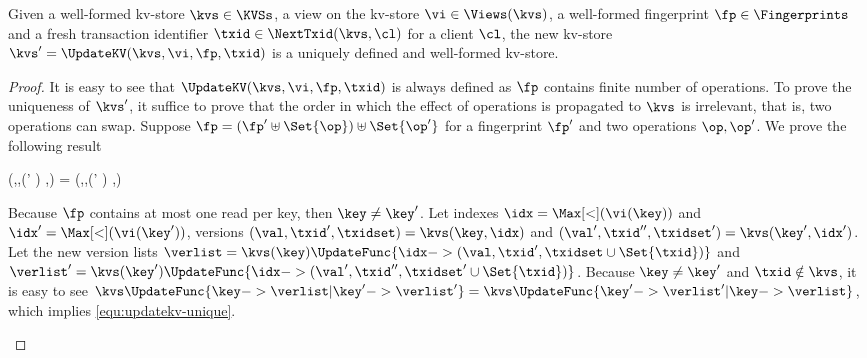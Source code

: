 \begin{toappendix} 
\label{sec:proof-well-formed-updatekv}
\end{toappendix} 
\begin{theoremrep}
\label{thm:well-deifned-updatekv}
Given a well-formed kv-store \( \kvs \in \KVSs \), a view on the kv-store \( \vi \in \Views(\kvs) \),
a well-formed fingerprint \( \fp \in \Fingerprints \) and 
a fresh transaction identifier \( \txid \in \NextTxid(\kvs,\cl) \) for a client \( \cl \),
the new kv-store \( \kvs' = \UpdateKV(\kvs,\vi,\fp,\txid)\) 
is a uniquely defined and well-formed kv-store.
\end{theoremrep}
\begin{proof}
It is easy to see that  \(\UpdateKV(\kvs,\vi,\fp,\txid) \) is always defined 
as \( \fp \) contains finite number of operations.
To prove the uniqueness of \( \kvs' \), it suffice to prove that the order 
in which the effect of operations is propagated to \( \kvs \) is irrelevant,
that is, two operations can swap.
Suppose \( \fp = (\fp' \uplus \Set{\op}) \uplus \Set{\op'} \) 
for a fingerprint \( \fp' \) and two operations \( \op, \op' \).
We prove  the following result
\begin{Formulae}
\begin{Formula}
    \UpdateKV(\kvs,\vi,(\fp' \uplus \Set{\op}) \uplus {},\txid) 
    = \UpdateKV(\kvs,\vi,(\fp' \uplus {}) \uplus \Set{\op},\txid)   
\end{Formula}
\label{equ:updatekv-unique}
\end{Formulae}
\begin{enumerate}
    \label{item:updatekv-unique-opr-opr}
    Because \( \fp \) contains at most one read per key, then \( \key \neq \key' \).
    Let indexes \( \idx = \Max[<](\vi(\key)) \) and 
    \(\idx' = \Max[<](\vi(\key')) \), 
    versions \( (\val,\txid',\txidset) = \kvs(\key,\idx) \) and
    \( (\val',\txid'',\txidset') = \kvs(\key',\idx') \).
    Let the new version lists 
    \( \verlist = \kvs(\key)\UpdateFunc{\idx -> (\val, \txid', \txidset \cup \Set{\txid})} \) and
    \( \verlist' = \kvs(\key')\UpdateFunc{\idx -> (\val', \txid'', \txidset' \cup \Set{\txid})} \).
    Because \( \key \neq \key' \) and \( \txid \notin \kvs \), it is easy to see 
    \(\kvs\UpdateFunc{ \key -> \verlist | \key' -> \verlist' } 
    = \kvs\UpdateFunc{ \key' -> \verlist' | \key -> \verlist }\),
    which implies \cref{equ:updatekv-unique}.

\end{enumerate}
\end{proof}
